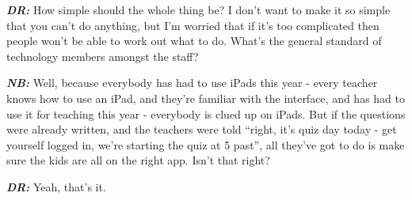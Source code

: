 \textit{\textbf{DR:}} How simple should the whole thing be? I don't want to make it so simple that you can't do anything, but I'm worried that if it's too complicated then people won't be able to work out what to do. What's the general standard of technology members amongst the staff?

\textit{\textbf{NB:}} Well, because everybody has had to use iPads this year - every teacher knows how to use an iPad, and they're familiar with the interface, and has had to use it for teaching this year - everybody is clued up on iPads. But if the questions were already written, and the teachers were told ``right, it's quiz day today - get yourself logged in, we're starting the quiz at 5 past'', all they've got to do is make sure the kids are all on the right app. Isn't that right?

\textit{\textbf{DR:}} Yeah, that's it.